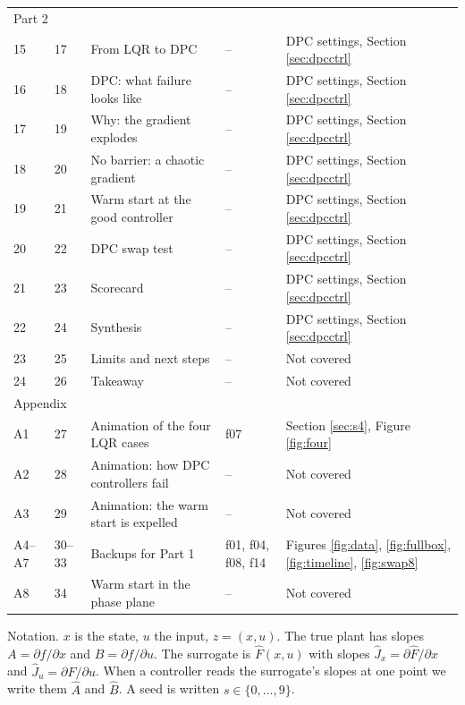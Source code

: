 \documentclass[11pt]{article}
\begin{document}
\begin{center}
\begin{tabular}{lllll}
\multicolumn{5}{l}{Part 2} \\
15 & 17 & From LQR to DPC & -- & DPC settings, Section \ref{sec:dpcctrl} \\
16 & 18 & DPC: what failure looks like & -- & DPC settings, Section \ref{sec:dpcctrl} \\
17 & 19 & Why: the gradient explodes & -- & DPC settings, Section \ref{sec:dpcctrl} \\
18 & 20 & No barrier: a chaotic gradient & -- & DPC settings, Section \ref{sec:dpcctrl} \\
19 & 21 & Warm start at the good controller & -- & DPC settings, Section \ref{sec:dpcctrl} \\
20 & 22 & DPC swap test & -- & DPC settings, Section \ref{sec:dpcctrl} \\
21 & 23 & Scorecard & -- & DPC settings, Section \ref{sec:dpcctrl} \\
22 & 24 & Synthesis & -- & DPC settings, Section \ref{sec:dpcctrl} \\
23 & 25 & Limits and next steps & -- & Not covered \\
24 & 26 & Takeaway & -- & Not covered \\
\midrule
\multicolumn{5}{l}{Appendix} \\
A1 & 27 & Animation of the four LQR cases & f07 & Section \ref{sec:s4}, Figure \ref{fig:four} \\
A2 & 28 & Animation: how DPC controllers fail & -- & Not covered \\
A3 & 29 & Animation: the warm start is expelled & -- & Not covered \\
A4--A7 & 30--33 & Backups for Part 1 & f01, f04, f08, f14 & Figures \ref{fig:data}, \ref{fig:fullbox}, \ref{fig:timeline}, \ref{fig:swap8} \\
A8 & 34 & Warm start in the phase plane & -- & Not covered \\
\bottomrule
\end{tabular}
\end{center}

Notation. $x$ is the state, $u$ the input, $z=(x,u)$. The true plant has slopes $A=\partial f/\partial x$ and $B=\partial f/\partial u$. The surrogate is $\hat F(x,u)$ with slopes $\hat J_x=\partial \hat F/\partial x$ and $\hat J_u=\partial \hat F/\partial u$. When a controller reads the surrogate's slopes at one point we write them $\hat A$ and $\hat B$. A seed is written $s\in\{0,\dots,9\}$.

\end{document}
